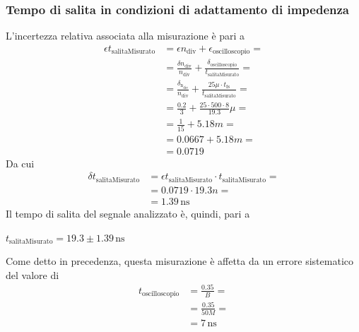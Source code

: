 \documentclass{article}
\begin{document}
			\subsubsection{Tempo di salita in condizioni di adattamento di impedenza}
				L'incertezza relativa associata alla misurazione è pari a 
				\begin{equation*}
					\begin{split}
						\epsilon t_{\mathrm{salitaMisurato}} &= \epsilon n_{\mathrm{div}} + \epsilon_{\mathrm{oscilloscopio}} = \\
														 	 &= \frac{\delta n_{\mathrm{div}}}{n_{\mathrm{div}}} + \frac{\delta_{\mathrm{oscilloscopio}}}{t_{\mathrm{salitaMisurato}}} = \\
														 	 &= \frac{\delta_{\mathrm{n_{\mathrm{div}}}}}{n_{\mathrm{div}}} + \frac{25\mu \cdot t_{\mathrm{fs}}}{t_{\mathrm{salitaMisurato}}} = \\
														 	 &= \frac{0.2}{3} + \frac{25 \cdot 500 \cdot 8}{19.3}\mu = \\
														 	 &= \frac{1}{15} + 5.18m = \\
														 	 &= 0.0667 + 5.18m = \\
														 	 &= 0.0719
					\end{split}
				\end{equation*}
				Da cui
				\begin{equation*}
					\begin{split}
						\delta t_{\mathrm{salitaMisurato}} &= \epsilon t_{\mathrm{salitaMisurato}} \cdot t_{\mathrm{salitaMisurato}} = \\
														   &= 0.0719 \cdot 19.3n = \\
														   &= 1.39 \, \mathrm{ns}
					\end{split}
				\end{equation*}
				Il tempo di salita del segnale analizzato è, quindi, pari a
				\newline
				\begin{center}
					$ t_{\mathrm{salitaMisurato}} = 19.3 \pm 1.39 \, \mathrm{ns} $
				\end{center}
				\newline
				Come detto in precedenza, questa misurazione è affetta da un errore sistematico del valore di
				\begin{equation*}
					\begin{split}
						t_{\mathrm{oscilloscopio}} &= \frac{0.35}{B} = \\
												   &= \frac{0.35}{50M} = \\
												   &= 7 \, \mathrm{ns}
					\end{split}
				\end{equation*}
\end{document}
